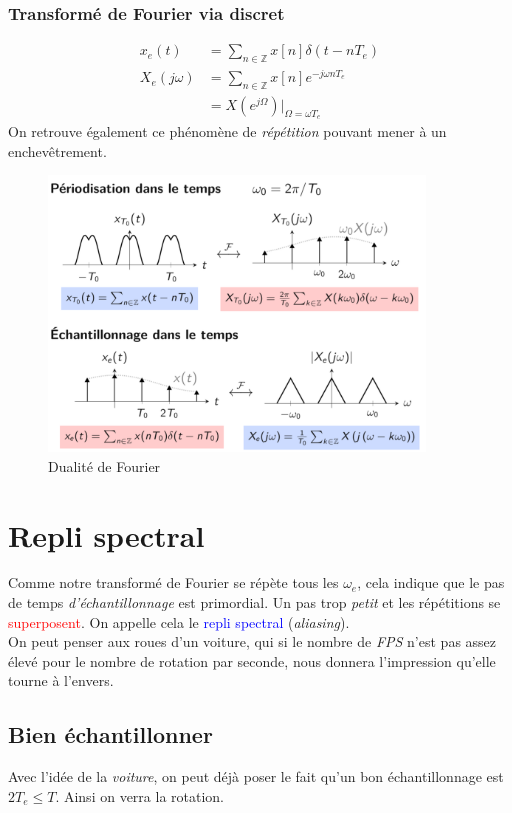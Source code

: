 \documentclass{report}
\begin{document}
\subsubsection{Transformé de Fourier via discret}
\begin{align*}
x_e(t)&= \sum_{n \in \mathbb{Z}} x[n]\delta(t-nT_e)\\
X_e(j\omega) &= \sum_{n \in \mathbb{Z}} x[n] e^{-j \omega n T_e}\\
&= X(e^{j\Omega})\vert_{\Omega = \omega T_e}
\end{align*}
On retrouve également ce phénomène de \textit{répétition} pouvant mener à un enchevêtrement.

\begin{figure}[H]
\centering
\includegraphics[width=10cm]{img/dua.png}
\caption{Dualité de Fourier}
\end{figure}

\section{Repli spectral} \label{spec}
Comme notre transformé de Fourier se répète tous les $\omega_e$, cela indique que le pas de temps \textit{d'échantillonnage} est primordial. Un pas trop \textit{petit} et les répétitions se \textcolor{red}{superposent}. On appelle cela le \textcolor{blue}{repli spectral} (\textit{aliasing}).\\
On peut penser aux roues d'un voiture, qui si le nombre de \textit{FPS} n'est pas assez élevé pour le nombre de rotation par seconde, nous donnera l'impression qu'elle tourne à l'envers.

\subsection{Bien échantillonner}
Avec l'idée de la \textit{voiture}, on peut déjà poser le fait qu'un bon échantillonnage est $2T_e \leq T$. Ainsi on verra la rotation.
\end{document}
